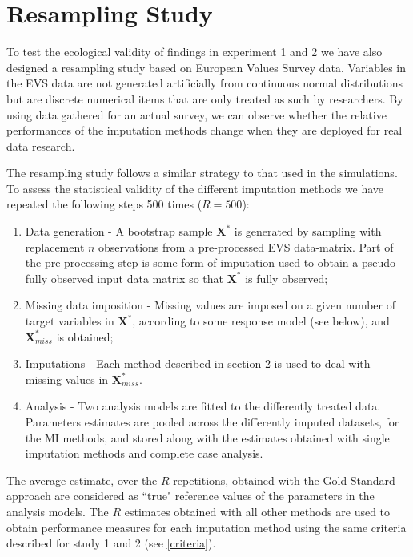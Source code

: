 \section{Resampling Study}

To test the ecological validity of findings in experiment 1 and 2 we have also designed a
resampling study based on European Values Survey data.
Variables in the EVS data are not generated artificially from continuous normal distributions 
but are discrete numerical items that are only treated as such by researchers.
By using data gathered for an actual survey, we can observe whether the relative 
performances of the imputation methods change when they are deployed for real data research.

The resampling study follows a similar strategy to that used in the simulations. 
To assess the statistical validity of the different imputation methods we have repeated the 
following steps 500 times ($R = 500$):

\begin{enumerate}
	\item Data generation - A bootstrap sample $\bm{X}^{*}$ is generated by sampling with replacement $n$ 
		observations from a pre-processed EVS data-matrix. 
		Part of the pre-processing step is some form of imputation used to obtain a pseudo-fully observed 
		input data matrix so that $\bm{X}^{*}$ is fully observed;
	\item Missing data imposition - Missing values are imposed on a given number of target variables
		in $\bm{X}^{*}$, according to some response model (see below), and $\bm{X}^{*}_{miss}$ is 
		obtained;
	\item Imputations - Each method described in section 2 is used to deal with missing values
		in $\bm{X}^{*}_{miss}$.
	\item Analysis - Two analysis models are fitted to the differently treated data.
		Parameters estimates are pooled across the differently imputed datasets, for the MI methods, and
		stored along with the estimates obtained with single imputation methods and complete case 
		analysis.
\end{enumerate}

	The average estimate, over the $R$ repetitions, obtained with the Gold Standard approach are considered 
	as ``true" reference values of the parameters in the analysis models.
	The $R$ estimates obtained with all other methods are used to obtain performance measures for each imputation 
	method using the same criteria described for study 1 and 2 (see \ref{criteria}).

